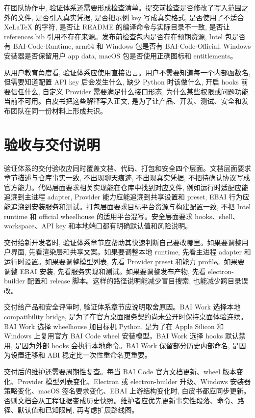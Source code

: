 在团队协作中, 验证体系还需要形成检查清单。提交前检查是否修改了写入范围之外的文件, 是否引入真实凭据, 是否把示例 key 写成真实格式, 是否使用了不适合 XeLaTeX 的字符, 是否让 README 的编译命令与实际目录不一致, 是否让 references.bib 引用不存在来源。发布前检查包内是否存在预期资源, Intel 包是否有 BAI-Code-Runtime, arm64 和 Windows 包是否有 BAI-Code-Official, Windows 安装器是否保留用户 app data, macOS 包是否使用正确图标和 entitlements。

从用户教育角度看, 验证体系应使用直接语言。用户不需要知道每一个内部函数名, 但需要知道配置 API key 后会发生什么, 缺少 Python 时该做什么, 开启 hooks 前要信任什么, 自定义 Provider 需要满足什么接口形态, 为什么某些权限或问题功能当前不可用。白皮书把这些解释写入正文, 是为了让产品、开发、测试、安全和发布团队在同一份材料上形成共识。

\section{验收与交付说明}
验证体系的交付验收应同时覆盖文档、代码、打包和安全四个层面。文档层面要求章节描述与仓库事实一致, 不出现聊天痕迹, 不出现真实凭据, 不把待确认协议写成官方能力。代码层面要求相关实现能在仓库中找到对应文件, 例如运行时适配应能追溯到主进程 adapter, Provider 能力应能追溯到共享设置和 preset, EBAI 行为应能追溯到安装服务和测试。打包层面要求目标平台资源与构建配置一致, 不把 Intel runtime 和 official wheelhouse 的适用平台混写。安全层面要求 hooks、shell、workspace、API key 和本地端口都有明确默认值和风险说明。

交付给新开发者时, 验证体系章节应帮助其快速判断自己要改哪里。如果要调整用户界面, 先看渲染层和共享文案。如果要调整本地 runtime, 先看主进程 adapter 和运行时设置。如果要调整模型列表, 先看 Provider preset 和能力 profile。如果要调整 EBAI 安装, 先看服务实现和测试。如果要调整发布产物, 先看 electron-builder 配置和 release 脚本。这样的路径说明能减少盲目搜索, 也能减少跨目录误改。

交付给产品和安全评审时, 验证体系章节应说明取舍原因。BAI Work 选择本地 compatibility bridge, 是为了在官方桌面服务契约尚未公开时保持桌面体验连续。BAI Work 选择 wheelhouse 加目标机 Python, 是为了在 Apple Silicon 和 Windows 上复用官方 BAI Code wheel 安装模型。BAI Work 选择 hooks 默认禁用, 是因为外部 hooks 会执行本地命令。BAI Work 保留部分历史内部命名, 是因为设置迁移和 ABI 稳定比一次性重命名更重要。

交付后的维护还需要周期性复查。每当 BAI Code 官方文档更新、wheel 版本变化、Provider 模型列表变化、Electron 或 electron-builder 升级、Windows 安装器策略变化、macOS 签名要求变化、EBAI 上游结构变化时, 白皮书都应同步更新。否则文档会从工程证据变成历史快照。维护者应优先更新事实性段落、命令、路径、默认值和已知限制, 再考虑扩展路线图。


